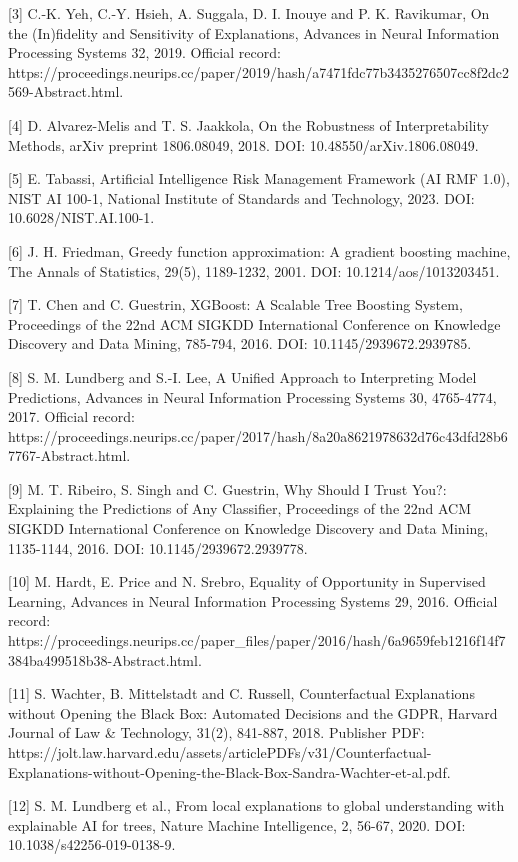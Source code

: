 \documentclass[12pt,a4paper]{report}
\begin{document}
[3] C.-K. Yeh, C.-Y. Hsieh, A. Suggala, D. I. Inouye and P. K. Ravikumar, On the (In)fidelity and Sensitivity of Explanations, Advances in Neural Information Processing Systems 32, 2019. Official record: https://proceedings.neurips.cc/paper/2019/hash/a7471fdc77b3435276507cc8f2dc2569-Abstract.html.

[4] D. Alvarez-Melis and T. S. Jaakkola, On the Robustness of Interpretability Methods, arXiv preprint 1806.08049, 2018. DOI: 10.48550/arXiv.1806.08049.

[5] E. Tabassi, Artificial Intelligence Risk Management Framework (AI RMF 1.0), NIST AI 100-1, National Institute of Standards and Technology, 2023. DOI: 10.6028/NIST.AI.100-1.

[6] J. H. Friedman, Greedy function approximation: A gradient boosting machine, The Annals of Statistics, 29(5), 1189-1232, 2001. DOI: 10.1214/aos/1013203451.

[7] T. Chen and C. Guestrin, XGBoost: A Scalable Tree Boosting System, Proceedings of the 22nd ACM SIGKDD International Conference on Knowledge Discovery and Data Mining, 785-794, 2016. DOI: 10.1145/2939672.2939785.

[8] S. M. Lundberg and S.-I. Lee, A Unified Approach to Interpreting Model Predictions, Advances in Neural Information Processing Systems 30, 4765-4774, 2017. Official record: https://proceedings.neurips.cc/paper/2017/hash/8a20a8621978632d76c43dfd28b67767-Abstract.html.

[9] M. T. Ribeiro, S. Singh and C. Guestrin, Why Should I Trust You?: Explaining the Predictions of Any Classifier, Proceedings of the 22nd ACM SIGKDD International Conference on Knowledge Discovery and Data Mining, 1135-1144, 2016. DOI: 10.1145/2939672.2939778.

[10] M. Hardt, E. Price and N. Srebro, Equality of Opportunity in Supervised Learning, Advances in Neural Information Processing Systems 29, 2016. Official record: https://proceedings.neurips.cc/paper\_files/paper/2016/hash/6a9659feb1216f14f7384ba499518b38-Abstract.html.

[11] S. Wachter, B. Mittelstadt and C. Russell, Counterfactual Explanations without Opening the Black Box: Automated Decisions and the GDPR, Harvard Journal of Law \& Technology, 31(2), 841-887, 2018. Publisher PDF: https://jolt.law.harvard.edu/assets/articlePDFs/v31/Counterfactual-Explanations-without-Opening-the-Black-Box-Sandra-Wachter-et-al.pdf.

[12] S. M. Lundberg et al., From local explanations to global understanding with explainable AI for trees, Nature Machine Intelligence, 2, 56-67, 2020. DOI: 10.1038/s42256-019-0138-9.
\end{document}
